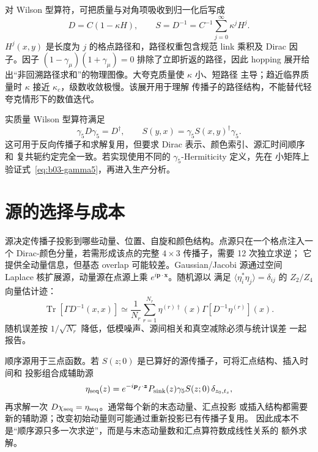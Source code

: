 对 Wilson 型算符，可把质量与对角项吸收到归一化后写成
\begin{equation}
  D=C(1-\kappa H),
  \qquad
  S=D^{-1}=C^{-1}\sum_{j=0}^{\infty}\kappa^jH^j .
  \label{eq:b03-hopping}
\end{equation}
\(H^j(x,y)\) 是长度为 \(j\) 的格点路径和，路径权重包含规范 link 乘积及 Dirac
因子。因子 \((1-\gamma_\mu)(1+\gamma_\mu)=0\) 排除了立即折返的路径，因此
hopping 展开给出“非回溯路径求和”的物理图像。大夸克质量使 \(\kappa\) 小、短路径
主导；趋近临界质量时 \(\kappa\) 接近 \(\kappa_c\)，级数收敛极慢。该展开用于理解
传播子的路径结构，不能替代轻夸克情形下的数值迭代。

实质量 Wilson 型算符满足
\begin{equation}
  \gamma_5D\gamma_5=D^\dagger,
  \qquad
  S(y,x)=\gamma_5S(x,y)^\dagger\gamma_5 .
  \label{eq:b03-gamma5}
\end{equation}
这可用于反向传播子和求解复用，但要求 Dirac 表示、颜色索引、源汇时间顺序和
复共轭约定完全一致。若实现使用不同的 \(\gamma_5\)-Hermiticity 定义，先在
小矩阵上验证式~\eqref{eq:b03-gamma5}，再进入生产分析。

\section{源的选择与成本}

源决定传播子投影到哪些动量、位置、自旋和颜色结构。点源只在一个格点注入一个
Dirac-颜色分量，若需形成该点的完整 \(4\times3\) 传播子，需要 12 次独立求逆；
它提供全动量信息，但基态 overlap 可能较差。Gaussian/Jacobi 源通过空间 Laplace
核扩展源，动量源在点源上乘 \(e^{i\boldsymbol p\cdot\boldsymbol x}\)。随机源以
满足 \(\langle\eta_i^*\eta_j\rangle=\delta_{ij}\) 的 \(Z_2/Z_4\) 向量估计迹：
\begin{equation}
  \operatorname{Tr}\!\left[\Gamma D^{-1}(x,x)\right]
  \simeq\frac{1}{N_r}\sum_{r=1}^{N_r}
  \eta^{(r)\dagger}(x)\Gamma[D^{-1}\eta^{(r)}](x).
  \label{eq:b03-stochastic-trace}
\end{equation}
随机误差按 \(1/\sqrt{N_r}\) 降低，低模噪声、源间相关和真空减除必须与统计误差
一起报告。

顺序源用于三点函数。若 \(S(z;0)\) 是已算好的源传播子，可将汇点结构、插入时间和
投影组合成辅助源
\begin{equation}
  \eta_{\rm seq}(z)=e^{-i\boldsymbol p_f\cdot\boldsymbol z}
  P_{\rm sink}(z)\gamma_5S(z;0)\,\delta_{z_0,t_s},
  \label{eq:b03-sequential-source}
\end{equation}
再求解一次 \(D\chi_{\rm seq}=\eta_{\rm seq}\)。通常每个新的末态动量、汇点投影
或插入结构都需要新的辅助源；改变初始动量则可能通过重新投影已有传播子复用。
因此成本不是“顺序源只多一次求逆”，而是与末态动量数和汇点算符数成线性关系的
额外求解。

